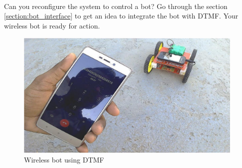 \paragraph{ } Can you reconfigure the system to control a bot? Go through the section \ref{section:bot_interface} to get an idea to integrate the bot with \ac{DTMF}. Your wireless bot is ready for action.

\begin{figure}
	\centering
	\includegraphics[width=4.3in]{Images/DTMF/wireless_bot.png}
	\caption{Wireless bot using DTMF}
\end{figure}

